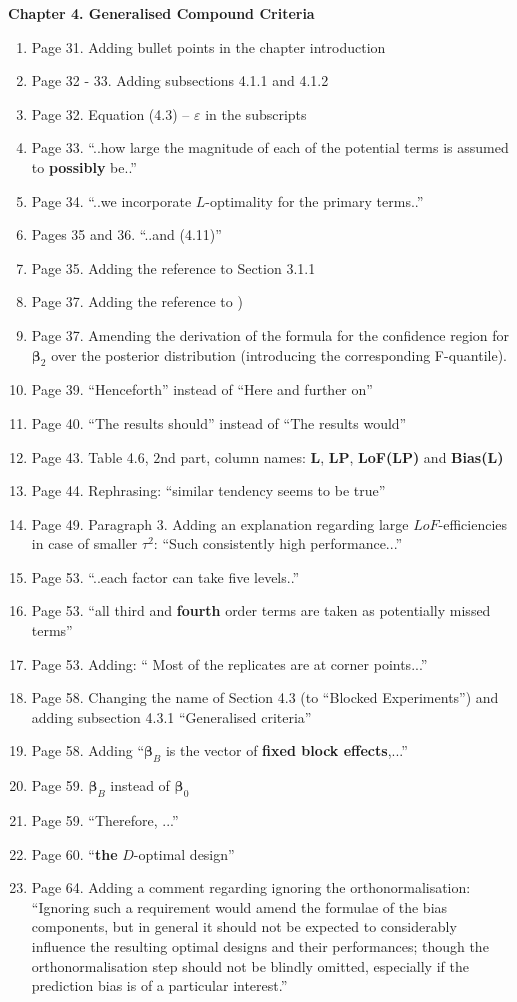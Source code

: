 \documentclass[11pt,a4paper,oneside]{article}
\begin{document}
\textbf{Chapter 4. Generalised Compound Criteria}
\begin{enumerate}
\item Page 31. Adding bullet points in the chapter introduction
\item Page 32 - 33. Adding subsections 4.1.1 and 4.1.2
\item Page 32. Equation (4.3) -- $\varepsilon$ in the subscripts
\item Page 33. ``..how large the magnitude of each of the potential terms is assumed to \textbf{possibly} be..''
\item Page 34. ``..we incorporate $L$-optimality for the primary terms..''
\item Pages 35 and 36. ``..and (4.11)''
\item Page 35. Adding the reference to Section 3.1.1
\item Page 37. Adding the reference to \cite{DuMouchel1994})
\item Page 37. Amending the derivation of the formula for the confidence region for $\bm{\beta}_2$ over the posterior distribution (introducing the corresponding F-quantile).
\item Page 39. ``Henceforth'' instead of ``Here and further on''
\item Page 40. ``The results should'' instead of ``The results would''
\item Page 43. Table 4.6, $2$nd part, column names: \textbf{L}, \textbf{LP}, \textbf{LoF(LP)} and \textbf{Bias(L)}
\item Page 44. Rephrasing: ``similar tendency seems to be true''
\item Page 49. Paragraph 3. Adding an explanation regarding large $LoF$-efficiencies in case of smaller $\tau^2$: ``Such consistently high performance...''
\item Page 53. ``..each factor can take five levels..''
\item Page 53. ``all third and \textbf{fourth} order terms are taken as potentially missed terms''
\item Page 53. Adding: `` Most of the replicates are at corner points...''
\item Page 58. Changing the name of Section 4.3 (to ``Blocked Experiments'') and adding  subsection 4.3.1 ``Generalised criteria''
\item Page 58. Adding ``$\bm{\beta}_{B}$ is the vector of \textbf{fixed block effects},...'' 
\item Page 59. $\bm{\beta}_{B}$ instead of $\bm{\beta}_{0}$
\item Page 59. ``Therefore, ...'' 
\item Page 60. ``\textbf{the} $D$-optimal design''
\item Page 64. Adding a comment regarding ignoring the orthonormalisation: ``Ignoring such a requirement would amend the formulae of the bias components, but in general it should not be expected to considerably influence the resulting optimal designs and their performances; though the orthonormalisation step should not be blindly omitted, especially if the prediction bias is of a particular interest.''
\end{enumerate}
\end{document}
